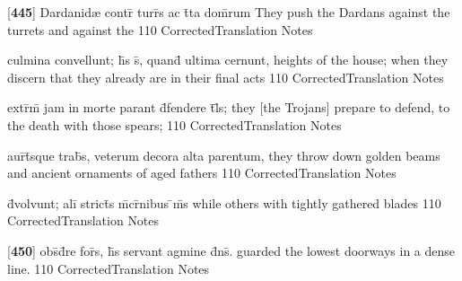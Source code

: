 \latline
  {[\textbf{445}] Dardanid{\ae} contr\={} turr\={\macron {\i}}s ac t\={}ta dom\={}rum}
  { They push the Dardans against the turrets and against the  }
  {110}
  { CorrectedTranslation }
  { Notes }


\latline
  {culmina convellunt; h\={\macron {\i}}s s\={}, quand\={} ultima cernunt,}
  { heights of the house; when they discern that they already are in their final acts }
  {110}
  { CorrectedTranslation }
  { Notes }


\latline
  {extr\={}m\={} jam in morte parant d\={}fendere t\={}l\={\macron {\i}}s;}
  { they [the Trojans] prepare to defend, to the death with those spears; }
  {110}
  { CorrectedTranslation }
  { Notes }


\latline
  {aur\={}t\={}sque trab\={}s, veterum decora alta parentum,}
  { they throw down golden beams and ancient ornaments of aged fathers }
  {110}
  { CorrectedTranslation }
  { Notes }


\latline
  {d\={}volvunt; ali\={\macron {\i}} strict\={\macron {\i}}s m\={}cr\={}nibus \={\macron {\i}}m\={}s}
  { while others with tightly gathered blades }
  {110}
  { CorrectedTranslation }
  { Notes }


\latline
  {[\textbf{450}] obs\={}d\={}re for\={}s, h\={}s servant agmine d\={}ns\={}.}
  { guarded the lowest doorways in a dense line. }
  {110}
  { CorrectedTranslation }
  { Notes }


